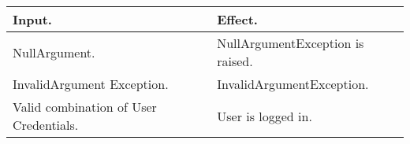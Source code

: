 \begin{flushleft}
\begin{tabular}{| p{} |p{}|}
			\textbf{Input}.		&		\textbf{Effect}.\\
			\hline
			
			NullArgument.		&		NullArgumentException is raised.\\
			\hline
			
			InvalidArgument Exception.		&		InvalidArgumentException.\\
			\hline
		
			Valid combination of User Credentials.		&		User is logged in.\\
			\hline
			\hline
		\end{tabular}

	\end{flushleft}
